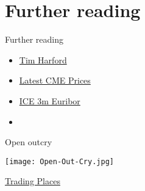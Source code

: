 \documentclass[14pt,xcolor=pdftex,dvipsnames,table]{beamer}\usepackage[]{graphicx}\usepackage[]{color}
\begin{document}
\section{Further reading}
\begin{frame}{Further reading}
\begin{itemize}[<+-| alert@+>]
\pause
\item \href{http://timharford.com/2016/03/how-to-make-good-guesses/}{Tim Harford}
\item \href{www.cmegroup.com/trading/interest-rates/eurodollar.html}{Latest CME Prices}
\item \href{https://www.theice.com/products/38527986/Three-Month-Euribor-Futures}{ICE 3m Euribor}
\item 
\end{itemize}
\end{frame}

\begin{frame}{Open outcry}
\begin{center}
\texttt{[image: Open-Out-Cry.jpg]}
\end{center}
\href{https://www.youtube.com/watch?v=RLySXTIBS3c}{Trading Places}
\end{frame}
\end{document}
